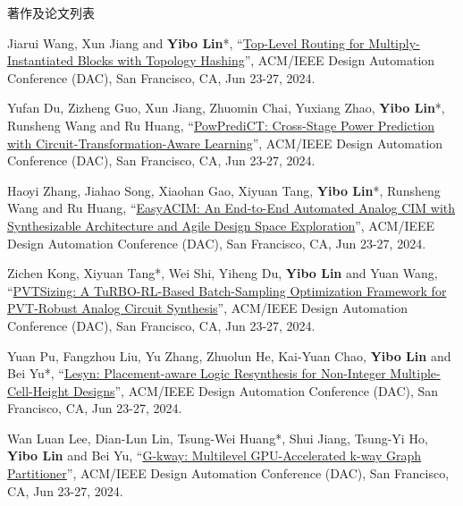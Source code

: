 \begin{rSection}{著作及论文列表}
\begin{description}[font=\normalfont, rightmargin=2em]
{}
            

\item[{[C156]}]{
        Jiarui Wang, Xun Jiang and \textbf{Yibo Lin}*, 
    ``\href{https://doi.org/10.1145/3649329.3655900}{Top-Level Routing for Multiply-Instantiated Blocks with Topology Hashing}'', 
    ACM/IEEE Design Automation Conference (DAC), San Francisco, CA, Jun 23-27, 2024.
    
}
            

\item[{[C155]}]{
        Yufan Du, Zizheng Guo, Xun Jiang, Zhuomin Chai, Yuxiang Zhao, \textbf{Yibo Lin}*, Runsheng Wang and Ru Huang, 
    ``\href{https://doi.org/10.1145/3649329.3657349}{PowPrediCT: Cross-Stage Power Prediction with Circuit-Transformation-Aware Learning}'', 
    ACM/IEEE Design Automation Conference (DAC), San Francisco, CA, Jun 23-27, 2024.
    
}
            

\item[{[C154]}]{
        Haoyi Zhang, Jiahao Song, Xiaohan Gao, Xiyuan Tang, \textbf{Yibo Lin}*, Runsheng Wang and Ru Huang, 
    ``\href{https://doi.org/10.1145/3649329.3656229}{EasyACIM: An End-to-End Automated Analog CIM with Synthesizable Architecture and Agile Design Space Exploration}'', 
    ACM/IEEE Design Automation Conference (DAC), San Francisco, CA, Jun 23-27, 2024.
    
}
            

\item[{[C153]}]{
        Zichen Kong, Xiyuan Tang*, Wei Shi, Yiheng Du, \textbf{Yibo Lin} and Yuan Wang, 
    ``\href{https://doi.org/10.1145/3649329.3661850}{PVTSizing: A TuRBO-RL-Based Batch-Sampling Optimization Framework for PVT-Robust Analog Circuit Synthesis}'', 
    ACM/IEEE Design Automation Conference (DAC), San Francisco, CA, Jun 23-27, 2024.
    
}
            

\item[{[C152]}]{
        Yuan Pu, Fangzhou Liu, Yu Zhang, Zhuolun He, Kai-Yuan Chao, \textbf{Yibo Lin} and Bei Yu*, 
    ``\href{https://doi.org/10.1145/3649329.3656243}{Lesyn: Placement-aware Logic Resynthesis for Non-Integer Multiple-Cell-Height Designs}'', 
    ACM/IEEE Design Automation Conference (DAC), San Francisco, CA, Jun 23-27, 2024.
    
}
            

\item[{[C151]}]{
        Wan Luan Lee, Dian-Lun Lin, Tsung-Wei Huang*, Shui Jiang, Tsung-Yi Ho, \textbf{Yibo Lin} and Bei Yu, 
    ``\href{https://doi.org/10.1145/3649329.3656238}{G-kway: Multilevel GPU-Accelerated k-way Graph Partitioner}'', 
    ACM/IEEE Design Automation Conference (DAC), San Francisco, CA, Jun 23-27, 2024.
    
}
\end{description}
\end{rSection}
